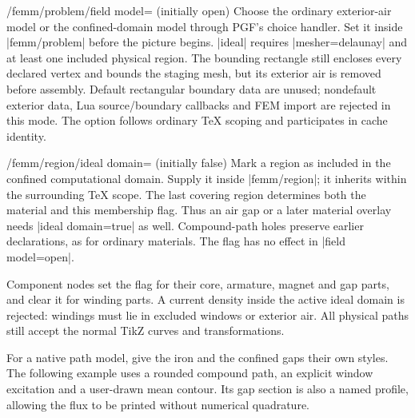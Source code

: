 \begin{key}{/femm/problem/field model= (initially open)}
Choose the ordinary exterior-air model or the confined-domain model through
PGF's choice handler. Set it inside |femm/problem| before the picture begins.
|ideal| requires |mesher=delaunay| and at least one included physical region.
The bounding rectangle still encloses every declared vertex and bounds the
staging mesh, but its exterior air is removed before assembly.
Default rectangular boundary data are unused; nondefault exterior data,
Lua source/boundary callbacks and FEM import are rejected in this mode.
The option follows ordinary TeX scoping and participates in cache identity.
\end{key}

\begin{key}{/femm/region/ideal domain= (initially false)}
Mark a region as included in the confined computational domain. Supply it
inside |femm/region|; it inherits within the surrounding TeX scope. The last
covering region determines both the material and this membership flag.
Thus an air gap or a later material overlay needs |ideal domain=true| as well.
Compound-path holes preserve earlier declarations, as for ordinary materials.
The flag has no effect in |field model=open|.

Component nodes set the flag for their core, armature, magnet and gap parts,
and clear it for winding parts. A current density inside the active ideal
domain is rejected: windings must lie in excluded windows or exterior air.
All physical paths still accept the normal TikZ curves and transformations.
\end{key}

For a native path model, give the iron and the confined gaps their own styles.
The following example uses a rounded compound path, an explicit
window excitation and a user-drawn mean contour. Its gap section is also a
named profile, allowing the flux to be printed without numerical quadrature.


\begin{codeexample}
\end{codeexample}

